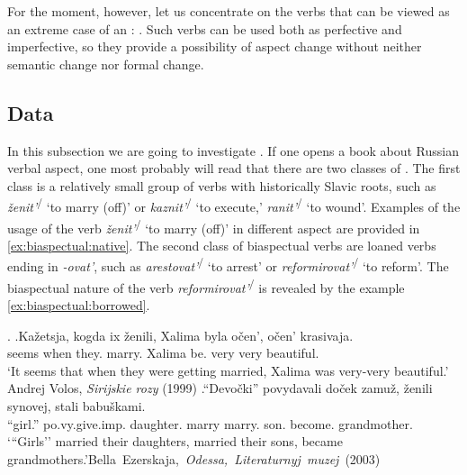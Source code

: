 For the moment, however, let us concentrate on the verbs that can be viewed as an extreme case of an : . Such verbs can be used both as perfective and imperfective, so they provide a possibility of aspect change without neither semantic change nor formal change.

\subsection{Data}\label{subsection:bi:data}


In this subsection we are going to investigate . If one opens a book about Russian verbal aspect, one most probably will read that there are two classes of . The first class is a relatively small group of verbs with historically Slavic roots, such as \textit{\v{z}enit'}\textsuperscript{\PF\slash\IPF} `to marry (off)' or \textit{kaznit'}\textsuperscript{\PF\slash\IPF} `to execute,' \textit{ranit'}\textsuperscript{\PF\slash\IPF} `to wound'. Examples of the usage of the verb \textit{\v{z}enit'}\textsuperscript{\PF\slash\IPF} `to marry (off)' in different aspect are provided in \ref{ex:biaspectual:native}. The second class of biaspectual verbs are loaned verbs ending in \textit{-ovat'}, such as \textit{arestovat'}\textsuperscript{\PF\slash\IPF} `to arrest' or \textit{reformirovat'}\textsuperscript{\PF\slash\IPF} `to reform'. The biaspectual nature of the verb \textit{reformirovat'}\textsuperscript{\PF\slash\IPF} is revealed by the example \ref{ex:biaspectual:borrowed}. 

\ex.\label{ex:biaspectual:native}
\ag.Ka\v{z}etsja, kogda ix \v{z}enili\textsuperscript{\IPF}, Xalima byla o\v{c}en', o\v{c}en' krasivaja.\\
seems when they. marry. Xalima be. very very beautiful.\\
\trans `It seems that when they were getting married, Xalima was very-very beautiful.' \hfill Andrej Volos, \textit{Sirijskie rozy} (1999)
\bg.``Devo\v{c}ki'' povydavali do\v{c}ek zamu\v{z}, \v{z}enili\textsuperscript{\PF} synovej, stali babu\v{s}kami.\\
``girl.'' po.vy.give.imp. daughter. marry marry. son. become. grandmother.\\
\trans `{``}Girls'' married their daughters, married their sons, became grandmothers.'\hfill\hbox{Bella Ezerskaja, \textit{Odessa, Literaturnyj muzej} (2003)}

